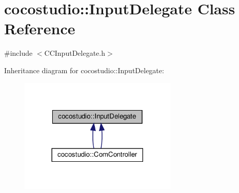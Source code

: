 \hypertarget{classcocostudio_1_1InputDelegate}{}\section{cocostudio\+:\+:Input\+Delegate Class Reference}
\label{classcocostudio_1_1InputDelegate}


{\ttfamily \#include $<$C\+C\+Input\+Delegate.\+h$>$}



Inheritance diagram for cocostudio\+:\+:Input\+Delegate\+:
\nopagebreak
\begin{figure}[H]
\begin{center}
\leavevmode
\includegraphics[width=213pt]{classcocostudio_1_1InputDelegate__inherit__graph}
\end{center}
\end{figure}

